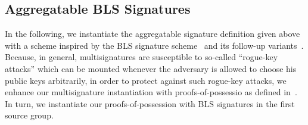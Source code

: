 \subsection{Aggregatable BLS Signatures}
\label{sec:bls}
\noindent In the following, we instantiate the aggregatable signature definition given above with a scheme inspired by the BLS signature
scheme~\cite{BLS_signatures} and its follow-up variants~\cite{proofs_of_posession,boneh_compact_multisig}.
Because, in general, multisignatures are susceptible to so-called ``rogue-key attacks'' which can be
mounted whenever the adversary is allowed to choose his public keys arbitrarily, in order to protect against such
rogue-key attacks, we enhance our multisignature instantiation with proofs-of-possessio as defined in~\cite{proofs_of_posession}.
In turn, we instantiate our proofs-of-possession with BLS signatures in the first source group.  

